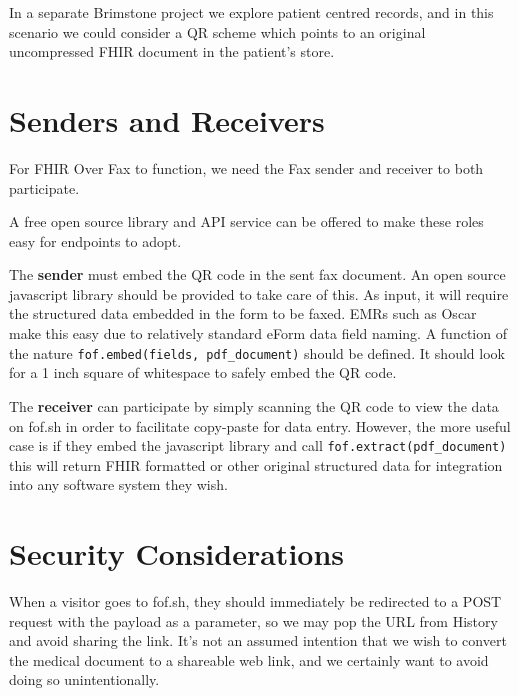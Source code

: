 \documentclass[12pt,a4paper]{article}
\begin{document}
In a separate Brimstone project we explore patient centred records, and in this scenario we could consider a QR scheme which points to an original uncompressed FHIR document in the patient’s store.


\section{Senders and Receivers}
For FHIR Over Fax to function, we need the Fax sender and receiver to both participate.

A free open source library and API service can be offered to make these roles easy for endpoints to adopt.

The \textbf{sender} must embed the QR code in the sent fax document. An open source javascript library should be provided to take care of this. As input, it will require the structured data embedded in the form to be faxed. EMRs such as Oscar make this easy due to relatively standard eForm data field naming. A function of the nature \verb+fof.embed(fields, pdf_document)+ should be defined. It should look for a 1 inch square of whitespace to safely embed the QR code.

The \textbf{receiver} can participate by simply scanning the QR code to view the data on fof.sh in order to facilitate copy-paste for data entry. However, the more useful case is if they embed the javascript library and call \verb+fof.extract(pdf_document)+ this will return FHIR formatted or other original structured data for integration into any software system they wish. 


\section{Security Considerations}
When a visitor goes to fof.sh, they should immediately be redirected to a POST request with the payload as a parameter, so we may pop the URL from History and avoid sharing the link. It’s not an assumed intention that we wish to convert the medical document to a shareable web link, and we certainly want to avoid doing so unintentionally.


\end{document}
